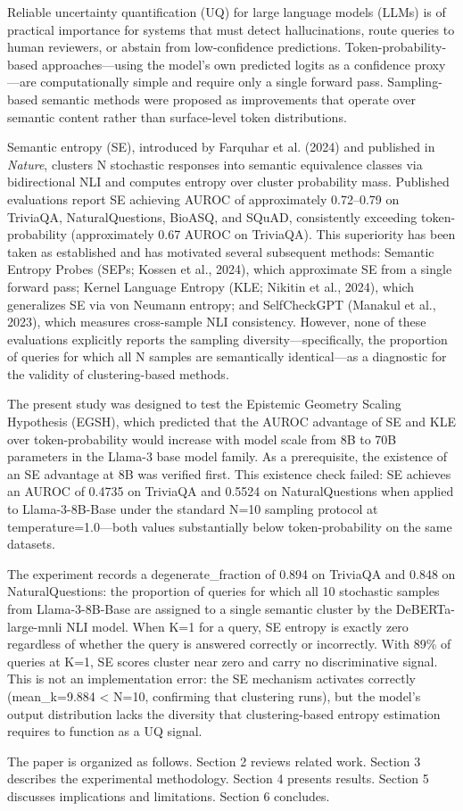 
Reliable uncertainty quantification (UQ) for large language models (LLMs) is of practical importance for systems that must detect hallucinations, route queries to human reviewers, or abstain from low-confidence predictions. Token-probability-based approaches—using the model's own predicted logits as a confidence proxy—are computationally simple and require only a single forward pass. Sampling-based semantic methods were proposed as improvements that operate over semantic content rather than surface-level token distributions.

Semantic entropy (SE), introduced by Farquhar et al. (2024) and published in \textit{Nature}, clusters N stochastic responses into semantic equivalence classes via bidirectional NLI and computes entropy over cluster probability mass. Published evaluations report SE achieving AUROC of approximately 0.72–0.79 on TriviaQA, NaturalQuestions, BioASQ, and SQuAD, consistently exceeding token-probability (approximately 0.67 AUROC on TriviaQA). This superiority has been taken as established and has motivated several subsequent methods: Semantic Entropy Probes (SEPs; Kossen et al., 2024), which approximate SE from a single forward pass; Kernel Language Entropy (KLE; Nikitin et al., 2024), which generalizes SE via von Neumann entropy; and SelfCheckGPT (Manakul et al., 2023), which measures cross-sample NLI consistency. However, none of these evaluations explicitly reports the sampling diversity—specifically, the proportion of queries for which all N samples are semantically identical—as a diagnostic for the validity of clustering-based methods.

The present study was designed to test the Epistemic Geometry Scaling Hypothesis (EGSH), which predicted that the AUROC advantage of SE and KLE over token-probability would increase with model scale from 8B to 70B parameters in the Llama-3 base model family. As a prerequisite, the existence of an SE advantage at 8B was verified first. This existence check failed: SE achieves an AUROC of 0.4735 on TriviaQA and 0.5524 on NaturalQuestions when applied to Llama-3-8B-Base under the standard N=10 sampling protocol at temperature=1.0—both values substantially below token-probability on the same datasets.

The experiment records a degenerate_fraction of 0.894 on TriviaQA and 0.848 on NaturalQuestions: the proportion of queries for which all 10 stochastic samples from Llama-3-8B-Base are assigned to a single semantic cluster by the DeBERTa-large-mnli NLI model. When K=1 for a query, SE entropy is exactly zero regardless of whether the query is answered correctly or incorrectly. With 89\% of queries at K=1, SE scores cluster near zero and carry no discriminative signal. This is not an implementation error: the SE mechanism activates correctly (mean_k=9.884 < N=10, confirming that clustering runs), but the model's output distribution lacks the diversity that clustering-based entropy estimation requires to function as a UQ signal.

The paper is organized as follows. Section 2 reviews related work. Section 3 describes the experimental methodology. Section 4 presents results. Section 5 discusses implications and limitations. Section 6 concludes.

